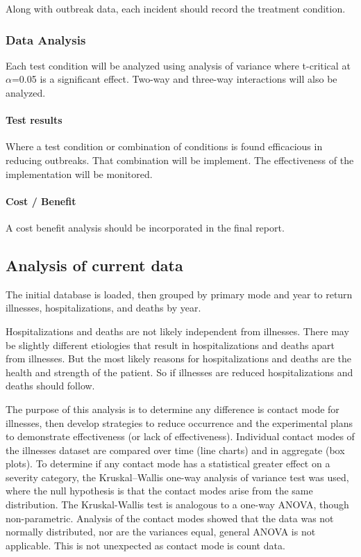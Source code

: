 \documentclass[11pt]{article}
\begin{document}
Along with outbreak data, each incident should record the treatment
condition.

    \hypertarget{data-analysis}{%
\subsubsection{Data Analysis}\label{data-analysis}}

Each test condition will be analyzed using analysis of variance where
t-critical at \(\alpha\)=0.05 is a significant effect. Two-way and
three-way interactions will also be analyzed.

    \hypertarget{test-results}{%
\paragraph{Test results}\label{test-results}}

Where a test condition or combination of conditions is found efficacious
in reducing outbreaks. That combination will be implement. The
effectiveness of the implementation will be monitored.

    \hypertarget{cost-benefit}{%
\paragraph{Cost / Benefit}\label{cost-benefit}}

A cost benefit analysis should be incorporated in the final report.

    \hypertarget{analysis-of-current-data}{%
\subsection{Analysis of current data}\label{analysis-of-current-data}}

The initial database is loaded, then grouped by primary mode and year to
return illnesses, hospitalizations, and deaths by year.

Hospitalizations and deaths are not likely independent from illnesses.
There may be slightly different etiologies that result in
hospitalizations and deaths apart from illnesses. But the most likely
reasons for hospitalizations and deaths are the health and strength of
the patient. So if illnesses are reduced hospitalizations and deaths
should follow.

The purpose of this analysis is to determine any difference is contact
mode for illnesses, then develop strategies to reduce occurrence and the
experimental plans to demonstrate effectiveness (or lack of
effectiveness). Individual contact modes of the illnesses dataset are
compared over time (line charts) and in aggregate (box plots). To
determine if any contact mode has a statistical greater effect on a
severity category, the Kruskal--Wallis one-way analysis of variance test
was used, where the null hypothesis is that the contact modes arise from
the same distribution. The Kruskal-Wallis test is analogous to a one-way
ANOVA, though non-parametric. Analysis of the contact modes showed that
the data was not normally distributed, nor are the variances equal,
general ANOVA is not applicable. This is not unexpected as contact mode
is count data.
\end{document}
